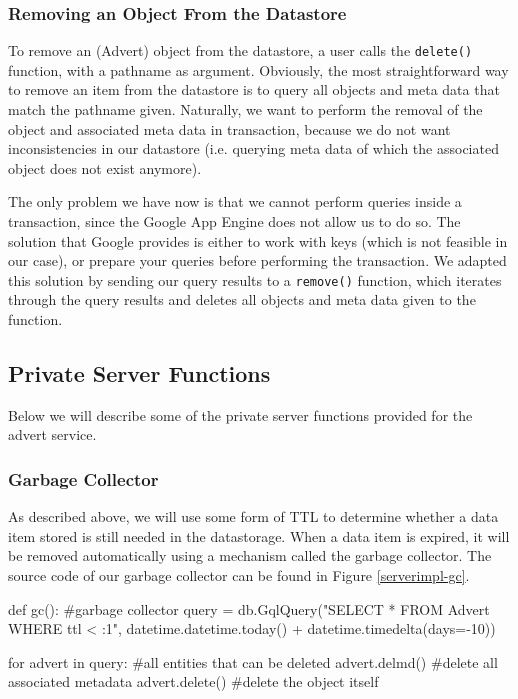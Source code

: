 \subsubsection{Removing an Object From the Datastore}
To remove an (Advert) object from the datastore, a user calls the
\texttt{delete()} function, with a pathname as argument. Obviously, the most
straightforward way to remove an item from the datastore is to query all
objects and meta data that match the pathname given. Naturally, we want to
perform the removal of the object and associated meta data in transaction,
because we do not want inconsistencies in our datastore (i.e. querying meta
data of which the associated object does not exist anymore).

The only problem we have now is that we cannot perform queries inside a
transaction, since the Google App Engine does not allow us to do so. The
solution that Google provides is either to work with keys (which is not
feasible in our case), or prepare your queries before performing the
transaction. We adapted this solution by sending our query results to a
\texttt{remove()} function, which iterates through the query results and
deletes all objects and meta data given to the function.

\subsection{Private Server Functions}
Below we will describe some of the private server functions provided for the
advert service.

\subsubsection{Garbage Collector}
As described above, we will use some form of TTL to determine whether a data item
stored is still needed in the datastorage. When a data item is expired, it will
be removed automatically using a mechanism called the garbage collector.
The source code of our garbage collector can be found in Figure
\ref{serverimpl-gc}.

\begin{figure*}[ht] %
\begin{center}
\begin{code}
def gc(): #garbage collector
  query = db.GqlQuery("SELECT * FROM Advert WHERE ttl < :1", 
                      datetime.datetime.today() + datetime.timedelta(days=-10))
  
  for advert in query: #all entities that can be deleted
    advert.delmd()     #delete all associated metadata
    advert.delete()    #delete the object itself
\end{code}
\caption{The Garbage Collector.\label{serverimpl-gc}}
\end{center}
\end{figure*}

